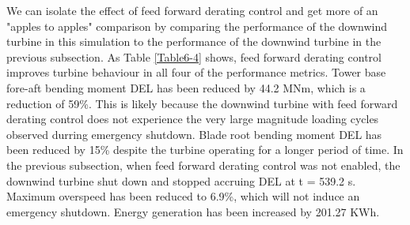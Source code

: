 We can isolate the effect of feed forward derating control and get more of an "apples to apples" comparison by comparing the performance of the downwind turbine in this simulation to the performance of the downwind turbine in the previous subsection. As Table \ref{Table6-4} shows, feed forward derating control improves turbine behaviour in all four of the performance metrics. Tower base fore-aft bending moment DEL has been reduced by 44.2 MNm, which is a reduction of 59\%. This is likely because the downwind turbine with feed forward derating control does not experience the very large magnitude loading cycles observed durring emergency shutdown. Blade root bending moment DEL has been reduced by 15\% despite the turbine operating for a longer period of time. In the previous subsection, when feed forward derating control was not enabled, the downwind turbine shut down and stopped accruing DEL at t = 539.2 s. Maximum overspeed has been reduced to 6.9\%, which will not induce an emergency shutdown. Energy generation has been increased by 201.27 KWh.

